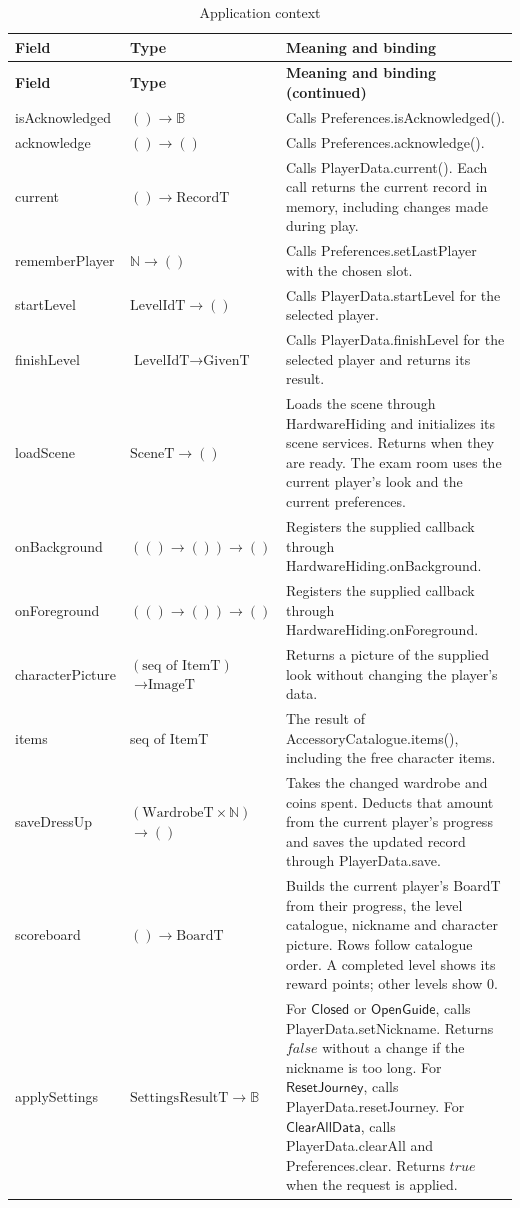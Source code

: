\documentclass[10pt, titlepage]{article}
\newcommand{\B}{\mathbb{B}}
\newcommand{\N}{\mathbb{N}}
\newcommand{\V}[1]{\mathsf{#1}}          %
\newcommand{\true}{\mathit{true}}
\newcommand{\false}{\mathit{false}}
\begin{document}
\begingroup
\small
\renewcommand{\arraystretch}{1.2}
\begin{longtable}{@{}p{}p{}p{}@{}}
\caption{Application context}\label{TblAppContext}\\
\toprule
\textbf{Field} & \textbf{Type} & \textbf{Meaning and binding}\\
\midrule
\endfirsthead
\toprule
\textbf{Field} & \textbf{Type} & \textbf{Meaning and binding (continued)}\\
\midrule
\endhead
\bottomrule
\endfoot
isAcknowledged & $() \to \B$ & Calls Preferences.isAcknowledged().\\[0.4em]
acknowledge & $() \to ()$ & Calls Preferences.acknowledge().\\[0.4em]
current & $() \to \text{RecordT}$ & Calls PlayerData.current(). Each call
returns the current record in memory, including changes made during play.\\[0.4em]
rememberPlayer & $\N \to ()$ & Calls Preferences.setLastPlayer with the
chosen slot.\\[0.4em]
startLevel & $\text{LevelIdT} \to ()$ & Calls PlayerData.startLevel for
the selected player.\\[0.4em]
finishLevel & $\text{LevelIdT} \to \text{GivenT}$ & Calls
PlayerData.finishLevel for the selected player and returns its result.\\[0.4em]
loadScene & $\text{SceneT} \to ()$ & Loads the scene through HardwareHiding
and initializes its scene services. Returns when they are ready. The exam
room uses the current player's look and the current preferences.\\[0.4em]
onBackground & $(() \to ()) \to ()$ & Registers the supplied callback
through HardwareHiding.onBackground.\\[0.4em]
onForeground & $(() \to ()) \to ()$ & Registers the supplied callback
through HardwareHiding.onForeground.\\[0.4em]
characterPicture & $(\text{seq of ItemT})$ $\to \text{ImageT}$ & Returns a
picture of the supplied look without changing the player's data.\\[0.4em]
items & seq of ItemT & The result of AccessoryCatalogue.items(), including
the free character items.\\[0.4em]
saveDressUp & $(\text{WardrobeT} \times \N)$ $\to ()$ & Takes the changed
wardrobe and coins spent. Deducts that amount from the current player's
progress and saves the updated record through PlayerData.save.\\[0.4em]
scoreboard & $() \to \text{BoardT}$ & Builds the current player's BoardT
from their progress, the level catalogue, nickname and character picture.
Rows follow catalogue order. A completed level shows its reward points;
other levels show 0.\\[0.4em]
applySettings & $\text{SettingsResultT} \to \B$ & For $\V{Closed}$ or $\V{OpenGuide}$,
calls PlayerData.setNickname. Returns $\false$ without a change if the
nickname is too long. For $\V{ResetJourney}$, calls PlayerData.resetJourney.
For $\V{ClearAllData}$, calls PlayerData.clearAll and Preferences.clear.
Returns $\true$ when the request is applied.\\
\end{longtable}
\end{document}
